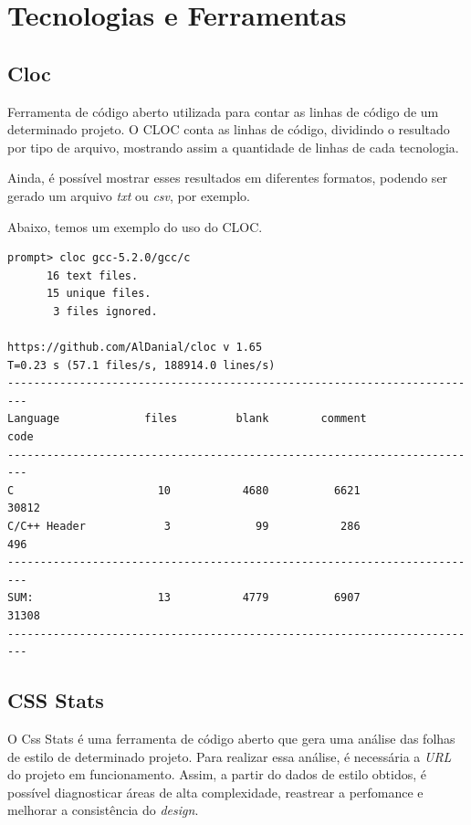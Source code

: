 \newpage

\hypertarget{tecnologias-e-ferramentas}{%
\section{Tecnologias e
Ferramentas}\label{tecnologias-e-ferramentas}}

\hypertarget{cloc}{%
\subsection{Cloc}\label{cloc}}

Ferramenta de código aberto utilizada para contar as linhas de código de um determinado projeto. O CLOC conta as linhas de código, dividindo o resultado por tipo de arquivo, mostrando assim a quantidade de linhas de cada tecnologia.

Ainda, é possível mostrar esses resultados em diferentes formatos, podendo ser gerado um arquivo \emph{txt} ou \emph{csv}, por exemplo.

Abaixo, temos um exemplo do uso do CLOC.

\begin{verbatim}
prompt> cloc gcc-5.2.0/gcc/c
      16 text files.
      15 unique files.
       3 files ignored.
       
https://github.com/AlDanial/cloc v 1.65
T=0.23 s (57.1 files/s, 188914.0 lines/s)
-------------------------------------------------------------------------
Language             files         blank        comment            code
-------------------------------------------------------------------------
C                      10           4680          6621            30812
C/C++ Header            3             99           286              496
-------------------------------------------------------------------------
SUM:                   13           4779          6907            31308
-------------------------------------------------------------------------
\end{verbatim}

\hypertarget{cssstats}{%
\subsection{CSS Stats}\label{cssstats}}

O Css Stats é uma ferramenta de código aberto que gera uma análise das folhas de estilo de determinado projeto. Para realizar essa análise, é necessária a \emph{URL} do projeto em funcionamento. Assim, a partir do dados de estilo obtidos, é possível diagnosticar áreas de alta complexidade, reastrear a perfomance e melhorar a consistência do \emph{design}.

